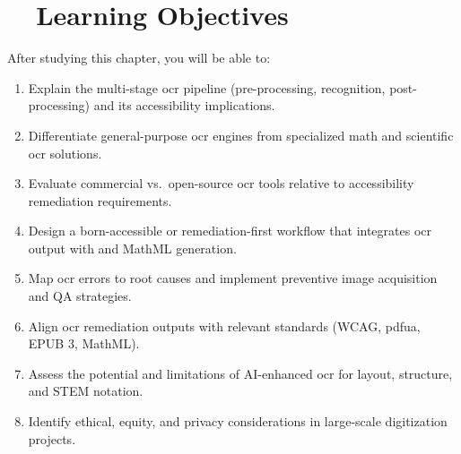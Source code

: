 \section{~~Learning Objectives}
\label{sec:ocr-learning-objectives}
After studying this chapter, you will be able to:
\begin{enumerate}
	\item Explain the multi-stage \gls{ocr} pipeline (pre-processing, recognition, post-processing) and its accessibility implications.
	\item Differentiate general-purpose \gls{ocr} engines from specialized math and scientific \gls{ocr} solutions.
	\item Evaluate commercial vs.\ open-source \gls{ocr} tools relative to accessibility remediation requirements.
	\item Design a born-accessible or remediation-first workflow that integrates \gls{ocr} output with  and MathML generation.
	\item Map \gls{ocr} errors to root causes and implement preventive image acquisition and QA strategies.
	\item Align \gls{ocr} remediation outputs with relevant standards (WCAG, \gls{pdfua}, EPUB 3, MathML).
	\item Assess the potential and limitations of AI-enhanced \gls{ocr} for layout, structure, and STEM notation.
	\item Identify ethical, equity, and privacy considerations in large-scale digitization projects.
\end{enumerate}

